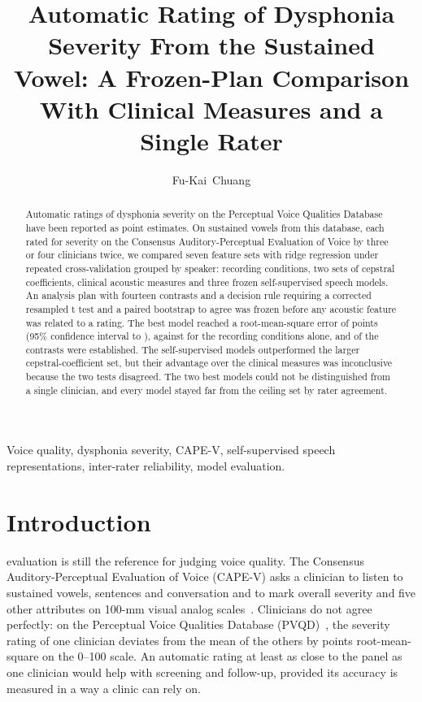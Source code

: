 \documentclass[journal]{IEEEtran}
\begin{document}
\title{Automatic Rating of Dysphonia Severity From the Sustained Vowel: A Frozen-Plan Comparison With Clinical Measures and a Single Rater}

\author{Fu-Kai~Chuang}

\maketitle

\begin{abstract}
Automatic ratings of dysphonia severity on the Perceptual Voice Qualities Database have been reported as point estimates. On \filesPrimary{} sustained vowels from this database, each rated for severity on the Consensus Auditory-Perceptual Evaluation of Voice by three or four clinicians twice, we compared seven feature sets with ridge regression under repeated cross-validation grouped by speaker: recording conditions, two sets of cepstral coefficients, clinical acoustic measures and three frozen self-supervised speech models. An analysis plan with fourteen contrasts and a decision rule requiring a corrected resampled t test and a paired bootstrap to agree was frozen before any acoustic feature was related to a rating. The best model reached a root-mean-square error of \eoneAfiveRmse{} points (95\% confidence interval \eoneAfiveRmseLow{} to \eoneAfiveRmseHigh{}), against \eoneMzeroRmse{} for the recording conditions alone, and \cEstablished{} of the \cTotal{} contrasts were established. The self-supervised models outperformed the larger cepstral-coefficient set, but their advantage over the clinical measures was inconclusive because the two tests disagreed. The two best models could not be distinguished from a single clinician, and every model stayed far from the ceiling set by rater agreement.
\end{abstract}

\begin{IEEEkeywords}
Voice quality, dysphonia severity, CAPE-V, self-supervised speech representations, inter-rater reliability, model evaluation.
\end{IEEEkeywords}

\section{Introduction}

 evaluation is still the reference for judging voice quality. The Consensus Auditory-Perceptual Evaluation of Voice (CAPE-V) asks a clinician to listen to sustained vowels, sentences and conversation and to mark overall severity and five other attributes on 100-mm visual analog scales~\cite{kempster2009capev}. Clinicians do not agree perfectly: on the Perceptual Voice Qualities Database (PVQD)~\cite{walden2022pvqd,walden2022pvqddata}, the severity rating of one clinician deviates from the mean of the others by \oneRaterRmse{} points root-mean-square on the 0--100 scale. An automatic rating at least as close to the panel as one clinician would help with screening and follow-up, provided its accuracy is measured in a way a clinic can rely on.
\end{document}
